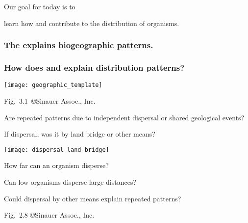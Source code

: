 \documentclass[t]{beamer}
\begin{document}

\begin{frame}[t]{Our goal for today is to }

	\hangpara learn how  and  contribute to the distribution of organisms.
	
\end{frame}
%
\begin{frame}[t]
	\frametitle<1>{The  explains biogeographic patterns.}
	\frametitle<2>{How does  and  explain distribution patterns?}
	
	\begin{center}
		\texttt{[image: geographic\_template]}
	\end{center}

	

	\vfilll
	
	\hfill \tiny Fig.~3.1~\copyright Sinauer Assoc., Inc.

\end{frame}
%
{
\begin{frame}[b]{Are repeated patterns due to independent dispersal or shared geological events?}

\end{frame}
}
%
\begin{frame}[t]{If dispersal, was it by land bridge or other means?}
	\begin{multicols}{2}
	
		\noindent\texttt{[image: dispersal\_land\_bridge]}
	
		\columnbreak
		
		\hangpara How far can an organism disperse?
	
		\hangpara Can low  organisms disperse large distances?
	
		\hangpara Could dispersal by other means explain repeated patterns?
	
	\end{multicols}

	\vfilll
	
	\hfill \tiny Fig.~2.8 \copyright Sinauer Assoc., Inc.
\end{frame}
\end{document}
